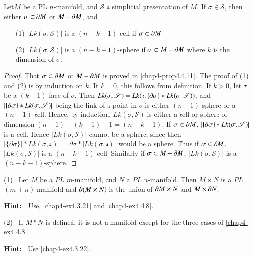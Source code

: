 \begin{proposition}\label{chap4-prop4.4.12}
Let\pageoriginale $M$ be a PL $n$-manifold, and $\mathscr{S}$ a simplicial presentation of $M$. If $\sigma\in\mathscr{S}$, then either $\sigma\subset \partial M$ or $M-\partial M$, and
\begin{itemize}
\item[\rm(1)] $|Lk(\sigma,\mathscr{S})|$ is a $(n-k-1)$-cell if $\sigma\subset \partial M$ 

\item[\rm(2)] $|Lk(\sigma,\mathscr{S})|$ is a $(n-k-1)$-sphere if $\sigma\subset M-\partial M$ where $k$ is the dimension of $\sigma$.
\end{itemize}
\end{proposition}

\begin{proof}
That $\sigma\subset \partial M$ or $M-\partial M$ is proved in \ref{chap4-prop4.4.11}. The proof of (1) and (2) is by induction on $k$. It $k=0$, this follows from definition. If $k>0$, let $\tau$ be a $(k-1)$-face of $\sigma$. Then $Lk(\sigma,\mathscr{S})=Lk(\tau,\{\partial\sigma\}\ast Lk(\sigma,\mathscr{S}))$, and $|\{\partial \sigma\}\ast Lk(\sigma,\mathscr{S})|$ being the link of a point in $\sigma$ is either $(n-1)$-sphere or a $(n-1)$-cell. Hence, by induction, $Lk(\sigma,\mathscr{S})$ is either a cell or sphere of dimension $(n-1)-(k-1)-1=(n-k-1)$. If $\sigma\subset \partial M$, $|\{\partial \sigma\}*Lk(\sigma,\mathscr{S})|$ is a cell. Hence $|Lk(\sigma,\mathscr{S})|$ cannot be a sphere, since then $|\{\partial \sigma\}| \ast Lk (\sigma, \mathscr{s})| = \partial \sigma \ast | Lk (\sigma, \mathscr{s})|$ would be a sphere. Thus if $\sigma\subset \partial M$, $|Lk(\sigma,\mathscr{S})|$ is a $(n-k-1)$-cell. Similarly if $\sigma\subset M-\partial M$, $|Lk(\sigma,\mathscr{S})|$ is a $(n-k-1)$-sphere.
\end{proof}

\begin{ex}\label{chap4-ex4.4.13}
(1)~ Let $M$ be a $PL$ $m$-manifold, and $N$ a $PL$ $n$-manifold. Then $M\times N$ is a $PL$ $(m+n)$-manifold and $\partial (M\times N)$ is the union of $\partial M\times N$ and $M\times \partial N$.
\smallskip

\noindent
{\bf Hint:~} Use, \ref{chap4-ex4.3.21} and \ref{chap4-ex4.4.8}.
\medskip

(2)~ If $M\ast N$ is defined, it is not a manifold except for the three cases of \ref{chap4-ex4.4.8}.
\smallskip

\medskip
\noindent
{\bf Hint:}~ Use \ref{chap4-ex4.3.22}.
\end{ex}

